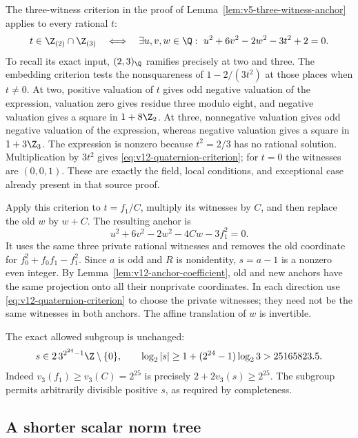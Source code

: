 The three-witness criterion in the proof of
Lemma~\ref{lem:v5-three-witness-anchor} applies to every rational $t$:
\begin{equation}\label{eq:v12-quaternion-criterion}
 t\in\Z_{(2)}\cap\Z_{(3)}
 \quad\Longleftrightarrow\quad
 \exists u,v,w\in\Q:\ u^2+6v^2-2w^2-3t^2+2=0.
\end{equation}
To recall its exact input, $(2,3)_\Q$ ramifies precisely at two and
three.  The embedding criterion
\cite[Proposition 14.6.7, pp.~223--224]{voight-quaternion} tests the nonsquareness of
$1-2/(3t^2)$ at those places when $t\ne0$.  At two, positive valuation
of $t$ gives odd negative valuation of the expression, valuation zero
gives residue three modulo eight, and negative valuation gives a
square in $1+8\Z_2$.  At three, nonnegative valuation gives odd negative
valuation of the expression, whereas negative valuation gives a square
in $1+3\Z_3$.  The expression is nonzero because $t^2=2/3$ has no
rational solution.  Multiplication by $3t^2$ gives
\eqref{eq:v12-quaternion-criterion}; for $t=0$ the witnesses are
$(0,0,1)$.  These are exactly the field, local conditions, and
exceptional case already present in that source proof.

Apply this criterion to $t=f_1/C$, multiply its witnesses by $C$,
and then replace the old $w$ by $w+C$.  The resulting anchor is
\begin{equation}\label{eq:v12-anchor}
 u^2+6v^2-2w^2-4Cw-3f_1^2=0.
\end{equation}
It uses the same three private rational witnesses and removes the
old coordinate for $f_0^2+f_0f_1-f_1^2$.  Since $a$ is odd and $R$ is
nonidentity, $s=a-1$ is a nonzero even integer.  By
Lemma~\ref{lem:v12-anchor-coefficient}, old and new anchors have the
same projection onto all their nonprivate coordinates.  In each
direction use \eqref{eq:v12-quaternion-criterion} to choose the private
witnesses; they need not be the same witnesses in both anchors.
The affine translation of $w$ is invertible.

The exact allowed subgroup is unchanged:
\begin{equation}\label{eq:v12-anchor-subgroup}
 s\in2\,3^{2^{24}-1}\Z\setminus\{0\},\qquad
 \log_2|s|\ge1+(2^{24}-1)\log_2 3>25165823.5.
\end{equation}
Indeed $v_3(f_1)\ge v_3(C)=2^{25}$ is precisely
$2+2v_3(s)\ge2^{25}$.  The subgroup permits arbitrarily divisible
positive $s$, as required by completeness.

\subsection{A shorter scalar norm tree}\label{subsec:v12-scalar}

